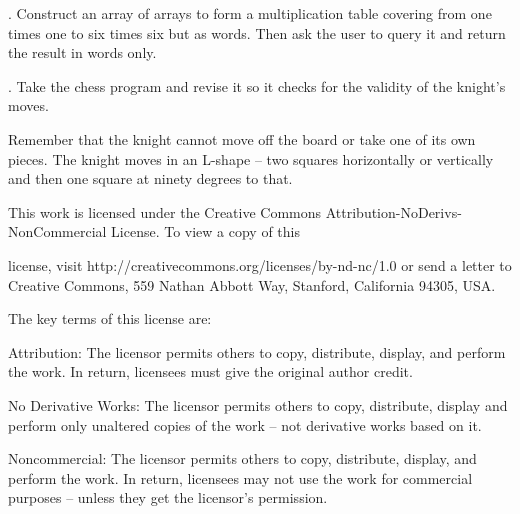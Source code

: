 \documentclass[a4paper,11pt]{book}
\begin{document}
\noindent 

.   Construct an array of arrays to form a multiplication table covering from one times one to six times six but as words. Then ask the user to query it and return the result in words only.

\noindent 

.   Take the chess program and revise it so it checks for the validity of the knight's moves.

\noindent Remember that the knight cannot move off the board or take one of its own pieces. The knight moves in an L-shape -- two squares horizontally or vertically and then one square at ninety degrees to that.

\noindent  

\noindent  

\noindent  

\noindent  

\noindent 

\noindent 

\noindent 

\noindent This work is licensed under the Creative Commons Attribution-NoDerivs-NonCommercial License. To view a copy of this

\noindent license, visit http://creativecommons.org/licenses/by-nd-nc/1.0 or send a letter to Creative Commons, 559 Nathan Abbott Way, Stanford, California 94305, USA.

\noindent 

\noindent The key terms of this license are:

\noindent 

\noindent Attribution: The licensor permits others to copy, distribute, display, and perform the work. In return, licensees must give the original author credit.

\noindent 

\noindent No  Derivative  Works: The licensor permits others to copy, distribute, display and perform only unaltered copies of the work -- not derivative works based on it.

\noindent 

\noindent Noncommercial: The licensor permits others to copy, distribute, display, and perform the work. In return, licensees may not use the work for commercial purposes -- unless they get the licensor's permission.
\end{document}
